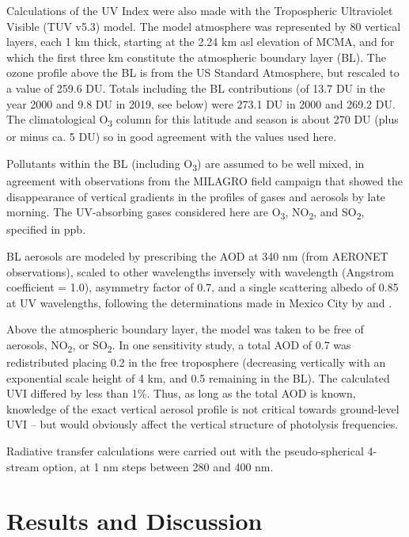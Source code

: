 \documentclass[journal=jacsat,manuscript=article]{achemso}
\begin{document}
Calculations of the UV Index were also made with the Tropospheric
Ultraviolet Visible (TUV v5.3) model.\citep{Madronich_1987} The
model atmosphere was represented by 80 vertical layers, each 1 km thick,
starting at the 2.24 km asl elevation of MCMA, and for which the first
three km constitute the atmospheric boundary layer
(BL).\citep{Shaw_2007} The ozone profile above the BL is from the US
Standard Atmosphere, but rescaled to a value of 259.6 DU. Totals
including the BL contributions (of 13.7 DU in the year 2000 and 9.8 DU
in 2019, see below) were 273.1 DU in 2000 and 269.2 DU. The
climatological O\textsubscript{3} column for this latitude and season is
about 270 DU (plus or minus ca. 5 DU) so in good agreement with the
values used here.

Pollutants within the BL (including O\textsubscript{3}) are assumed to
be well mixed, in agreement with observations from the MILAGRO field
campaign that showed the disappearance of vertical gradients in the
profiles of gases \citep{Velasco_2008,Greenberg_2009} and aerosols
\citep{Rogers_2009,Lewandowski_2010} by late morning. The UV-absorbing gases
considered here are O\textsubscript{3}, NO\textsubscript{2},
and SO\textsubscript{2}, specified in ppb.

BL aerosols are modeled by prescribing the AOD at 340 nm (from AERONET
observations), scaled to other wavelengths inversely with wavelength
(Angstrom coefficient = 1.0), asymmetry factor of 0.7, and a single
scattering albedo of 0.85 at UV wavelengths, following the
determinations made in Mexico City by \citet{Corr_2009} and
\citet{Palancar_2013}.

Above the atmospheric boundary layer, the model was taken to be free of
aerosols, NO\textsubscript{2}, or SO\textsubscript{2}. In one
sensitivity study, a total AOD of 0.7 was redistributed placing 0.2 in
the free troposphere (decreasing vertically with an exponential scale
height of 4 km, and 0.5 remaining in the BL). The calculated UVI
differed by less than 1\%. Thus, as long as the total AOD is known,
knowledge of the exact vertical aerosol profile is not critical towards
ground-level UVI -- but would obviously affect the vertical structure of
photolysis frequencies.

Radiative transfer calculations were carried out with the
pseudo-spherical 4-stream option, at 1 nm steps between 280 and 400 nm.




\section{Results and Discussion}
\label{results-and-discussion}
\end{document}
